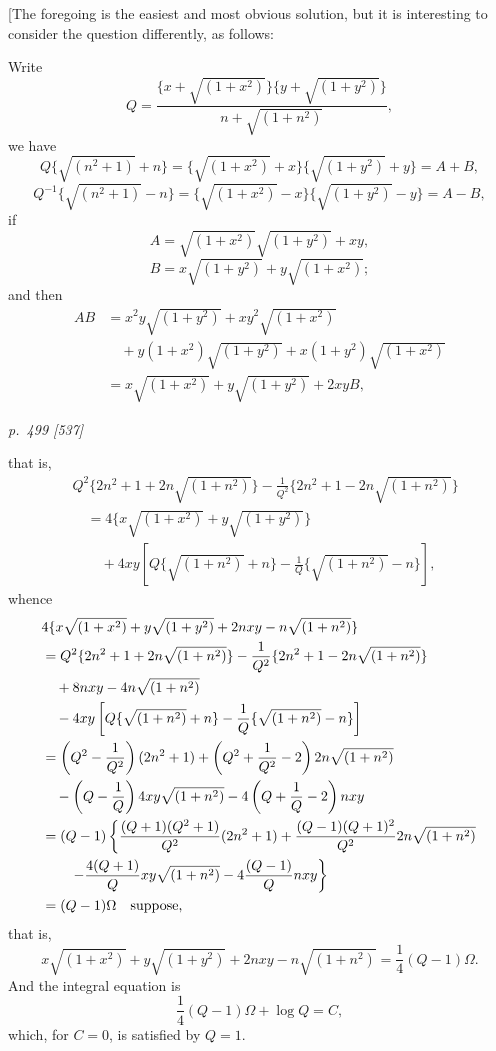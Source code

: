\documentclass[11pt,a4paper]{article}
\theoremstyle{plain}
\theoremstyle{definition}
\newcommand{\sqr}[1]{\sqrt{(#1)}}
\begin{document}
[The foregoing is the easiest and most obvious solution, but it is interesting to
consider the question differently, as follows:

Write
\[
Q=\frac{\{x+\sqr{1+x^2}\}\{y+\sqr{1+y^2}\}}{n+\sqr{1+n^2}},
\]
we have
\[
Q\{\sqr{n^2+1}+n\}
=\{\sqr{1+x^2}+x\}\{\sqr{1+y^2}+y\}=A+B,
\]
\[
Q^{-1}\{\sqr{n^2+1}-n\}
=\{\sqr{1+x^2}-x\}\{\sqr{1+y^2}-y\}=A-B,
\]
if
\[
A=\sqr{1+x^2}\sqr{1+y^2}+xy,
\]
\[
B=x\sqr{1+y^2}+y\sqr{1+x^2};
\]
and then
\begin{align*}
AB&=x^2y\sqr{1+y^2}+xy^2\sqr{1+x^2} \\
&\quad +y(1+x^2)\sqr{1+y^2}+x(1+y^2)\sqr{1+x^2} \\
&=x\sqr{1+x^2}+y\sqr{1+y^2}+2xyB,
\end{align*}
\clearpage

\bigskip
\textit{p.~499 [537]}
\smallskip

\noindent

that is,
\begin{align*}
&Q^2\{2n^2+1+2n\sqr{1+n^2}\}
-\frac{1}{Q^2}\{2n^2+1-2n\sqr{1+n^2}\} \\
&\quad =4\{x\sqr{1+x^2}+y\sqr{1+y^2}\} \\
&\qquad +4xy\left[Q\{\sqr{1+n^2}+n\}
-\frac{1}{Q}\{\sqr{1+n^2}-n\}\right],
\end{align*}
whence
\begin{align*}
&4\{x\sqr{1+x^2}+y\sqr{1+y^2}+2nxy-n\sqr{1+n^2}\} \\
&=Q^2\{2n^2+1+2n\sqr{1+n^2}\}
-\frac{1}{Q^2}\{2n^2+1-2n\sqr{1+n^2}\} \\
&\quad +8nxy-4n\sqr{1+n^2} \\
&\quad -4xy\left[Q\{\sqr{1+n^2}+n\}
-\frac{1}{Q}\{\sqr{1+n^2}-n\}\right] \\
&=\left(Q^2-\frac{1}{Q^2}\right)(2n^2+1)
+\left(Q^2+\frac{1}{Q^2}-2\right)2n\sqr{1+n^2} \\
&\quad -\left(Q-\frac{1}{Q}\right)4xy\sqr{1+n^2}
-4\left(Q+\frac{1}{Q}-2\right)nxy \\
&=(Q-1)\left\{
\frac{(Q+1)(Q^2+1)}{Q^2}(2n^2+1)
+\frac{(Q-1)(Q+1)^2}{Q^2}2n\sqr{1+n^2}\right.\\
&\qquad\left.
-\frac{4(Q+1)}{Q}xy\sqr{1+n^2}
-4\frac{(Q-1)}{Q}nxy\right\} \\
&=(Q-1)\Omega\quad\hbox{suppose,}
\end{align*}
that is,
\[
x\sqr{1+x^2}+y\sqr{1+y^2}+2nxy-n\sqr{1+n^2}
=\frac{1}{4}(Q-1)\Omega.
\]
And the integral equation is
\[
\frac{1}{4}(Q-1)\Omega+\log Q=C,
\]
which, for \(C=0\), is satisfied by \(Q=1\).
\end{document}
